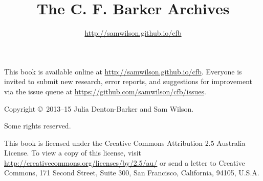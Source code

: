\documentclass[a4paper]{book}
\title{The C. F. Barker Archives}
\author{\url{http://samwilson.github.io/cfb}}
\begin{document}
\maketitle
 
\thispagestyle{empty}
\begin{center}\footnotesize
This book is available online at \url{http://samwilson.github.io/cfb}.
Everyone is invited to submit new research, error reports, and suggestions for improvement
via the issue queue at \url{https://github.com/samwilson/cfb/issues}.

\vspace{1cm}

Copyright \copyright\ 2013--15 Julia Denton-Barker and Sam Wilson.

Some rights reserved.

This book is licensed under the Creative Commons Attribution 2.5 Australia License.
To view a copy of this license, visit \url{http://creativecommons.org/licenses/by/2.5/au/} or send a letter to Creative Commons, 171 Second Street, Suite 300, San Francisco, California, 94105, U.S.A.
\end{center}


\tableofcontents
\end{document}
